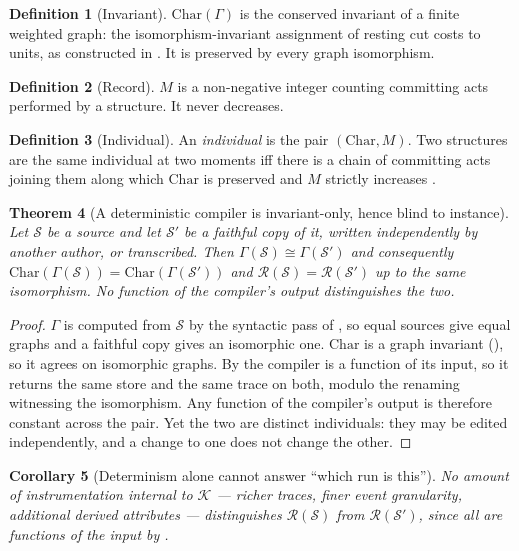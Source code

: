 \documentclass[twocolumn,11pt,a4paper]{article}
\theoremstyle{sup}
\newtheorem{theorem}{Theorem}[section]
\newtheorem{corollary}[theorem]{Corollary}
\theoremstyle{definition}
\newtheorem{definition}[theorem]{Definition}
\theoremstyle{remark}
\newcommand{\Gph}{\Gamma}
\newcommand{\rec}{M}
\newcommand{\Char}{\mathrm{Char}}
\newcommand{\Src}{\mathcal{S}}
\newcommand{\Cmp}{\mathcal{K}}
\newcommand{\Run}{\mathcal{R}}
\begin{document}
\begin{definition}[Invariant]
\label{def:char}
$\Char(\Gph)$ is the conserved invariant of a finite weighted graph: the
isomorphism-invariant assignment of resting cut costs to units, as constructed
in \citet{sachikonye2025residue}. It is preserved by every graph isomorphism.
\end{definition}

\begin{definition}[Record]
\label{def:rec}
$\rec$ is a non-negative integer counting committing acts performed by a
structure. It never decreases.
\end{definition}

\begin{definition}[Individual]
\label{def:individual-srg}
An \emph{individual} is the pair $(\Char,\rec)$. Two structures are the same
individual at two moments iff there is a chain of committing acts joining them
along which $\Char$ is preserved and $\rec$ strictly increases
\citep{sachikonye2025directional}.
\end{definition}

\begin{theorem}[A deterministic compiler is invariant-only, hence blind to instance]
\label{thm:compiler-blind}
Let $\Src$ be a source and let $\Src'$ be a faithful copy of it, written
independently by another author, or transcribed. Then
$\Gph(\Src)\cong\Gph(\Src')$ and consequently
$\Char(\Gph(\Src))=\Char(\Gph(\Src'))$ and
$\Run(\Src)=\Run(\Src')$ up to the same isomorphism. No function of the
compiler's output distinguishes the two.
\end{theorem}

\begin{proof}
$\Gph$ is computed from $\Src$ by the syntactic pass of , so
equal sources give equal graphs and a faithful copy gives an isomorphic one.
$\Char$ is a graph invariant (), so it agrees on isomorphic
graphs. By  the compiler is a function of its input, so it returns
the same store and the same trace on both, modulo the renaming witnessing the
isomorphism. Any function of the compiler's output is therefore constant across
the pair. Yet the two are distinct individuals: they may be edited
independently, and a change to one does not change the other.
\end{proof}

\begin{corollary}[Determinism alone cannot answer ``which run is this'']
\label{cor:which-run}
No amount of instrumentation internal to $\Cmp$ --- richer traces, finer event
granularity, additional derived attributes --- distinguishes $\Run(\Src)$ from
$\Run(\Src')$, since all are functions of the input by .
\end{corollary}
\end{document}
